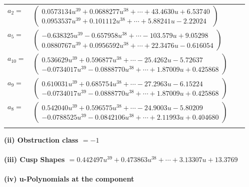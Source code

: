 \documentclass[1p]{elsarticle_modified}
\theoremstyle{definition}
\begin{document}
\begin{tabular}{m{7pt} m{180pt} m{7pt} m{180pt} }
\flushright $a_{2}=$&$\begin{pmatrix}0.0573134 u^{39}+0.0688277 u^{38}+\cdots+43.4630 u+6.53740\\0.0953537 u^{39}+0.101112 u^{38}+\cdots+5.88241 u-2.22024\end{pmatrix}$ \\
\flushright $a_{5}=$&$\begin{pmatrix}-0.638325 u^{39}-0.657958 u^{38}+\cdots-103.579 u+9.05298\\0.0880767 u^{39}+0.0956592 u^{38}+\cdots+22.3476 u-0.616054\end{pmatrix}$ \\
\flushright $a_{10}=$&$\begin{pmatrix}0.536629 u^{39}+0.596877 u^{38}+\cdots-25.4262 u-5.72637\\-0.0734017 u^{39}-0.0888770 u^{38}+\cdots+1.87009 u+0.425868\end{pmatrix}$ \\
\flushright $a_{9}=$&$\begin{pmatrix}0.610031 u^{39}+0.685754 u^{38}+\cdots-27.2963 u-6.15224\\-0.0734017 u^{39}-0.0888770 u^{38}+\cdots+1.87009 u+0.425868\end{pmatrix}$ \\
\flushright $a_{8}=$&$\begin{pmatrix}0.542040 u^{39}+0.596575 u^{38}+\cdots-24.9003 u-5.80209\\-0.0788525 u^{39}-0.0842106 u^{38}+\cdots+2.11993 u+0.404680\end{pmatrix}$\\&\end{tabular}
\flushleft \textbf{(ii) Obstruction class $= -1$}\\~\\
\flushleft \textbf{(iii) Cusp Shapes $= 0.442497 u^{39}+0.473863 u^{38}+\cdots+3.13307 u+13.3769$}\\~\\
\newpage\renewcommand{\arraystretch}{1}
\flushleft \textbf{(iv) u-Polynomials at the component}\newline \\
\end{document}
